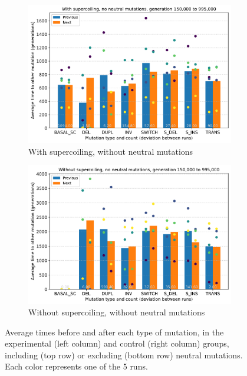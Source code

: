 \begin{figure}[h]
  \begin{subfigure}[b]{0.49\textwidth}
    \includegraphics[width=\textwidth]{aevol/images/with_sc_mut_time_no_neutral_150k_995k.pdf}
    \caption{With supercoiling, without neutral mutations}
    \label{subfig:sc_no_neut}
  \end{subfigure}
  \begin{subfigure}[b]{0.49\textwidth}
    \includegraphics[width=\textwidth]{aevol/images/without_sc_mut_time_no_neutral_150k_995k.pdf}
    \caption{Without supercoiling, without neutral mutations}
    \label{subfig:no_sc_no_neut}
  \end{subfigure}

  \caption{Average times before and after each type of mutation, in the experimental (left column) and control (right column) groups, including (top row) or excluding (bottom row) neutral mutations. Each color represents one of the 5 runs.}
  \label{fig:mut_times}
\end{figure}


